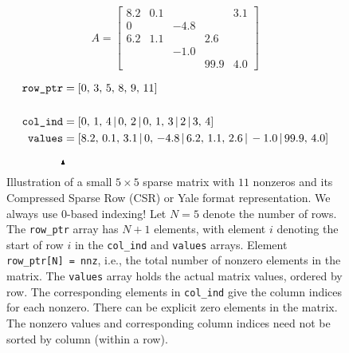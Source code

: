 \documentclass{article}
\newcommand{\tikzmark}[1]{\tikz[overlay,remember picture] \node (#1) {};}
\begin{document}
\begin{figure}
  \begin{center}
    \begin{minipage}{.39\textwidth}
      \[
        A = \begin{bmatrix}
          8.2 & 0.1 & & & 3.1 \\
          0 &  & -4.8 \\
          6.2 & 1.1 &  & 2.6 \\
          & & -1.0 &  &  \\
          & & & 99.9 & 4.0
        \end{bmatrix}
      \]
    \end{minipage}
    \begin{minipage}{.59\textwidth}
      \vspace{.4cm}
      \begin{align*}
        \texttt{row\_ptr} &= [\tikzmark{a1}0, \, \tikzmark{a2}3, \, \tikzmark{a3}5, \, \tikzmark{a4}8, \, \tikzmark{a5}9, \, 11 ] \\
        \\
        \texttt{col\_ind} &= [ \tikzmark{b1}0,   \, 1,   \, 4   \, | \, 0\tikzmark{b2}, \, 2    \,| \, 0\tikzmark{b3},   \, 1,   \, 3
                          \,| \, 2\tikzmark{b4}    \,| \, 3\tikzmark{b5},    \, 4   ] \\
        \texttt{values} &= [ 8.2, \, 0.1, \, 3.1 \, | \, 0, \, -4.8 \,| \, 6.2, \, 1.1, \, 2.6 \,| \, -1.0 \,| \, 99.9, \, 4.0 ] \\
        \begin{tikzpicture}[overlay,remember picture,-latex,shorten >=5pt,shorten <=5pt,out=70,in=130]
          \draw (a1.south)+(0,0.2) -- (b1.north);
          \draw (a2.south)+(0,0.15) -- (b2.north);
          \draw (a3.south)+(0,0.15) -- (b3.north);
          \draw (a4.south)+(0,0.15) -- (b4.north);
          \draw (a5.south)+(0,0.15) -- (b5.north);
        \end{tikzpicture}
      \end{align*}
    \end{minipage}
    \vspace{-.4cm}
  \end{center}
  \caption{Illustration of a small $5 \times 5$ sparse matrix with
    $11$ nonzeros and its Compressed Sparse Row (CSR) or Yale format
    representation. We always use $0$-based indexing! Let $N=5$ denote
    the number of rows. The \texttt{row\_ptr} array has $N+1$
    elements, with element $i$ denoting the start of row $i$ in the
    \texttt{col\_ind} and \texttt{values} arrays. Element
    \texttt{row\_ptr[N] = nnz}, i.e., the total number of nonzero
    elements in the matrix. The \texttt{values} array holds the actual
    matrix values, ordered by row. The corresponding elements in
    \texttt{col\_ind} give the column indices for each nonzero. There
    can be explicit zero elements in the matrix. The nonzero values
    and corresponding column indices need not be sorted by column
    (within a row).}
  \label{fig::csr}
\end{figure}
\end{document}
